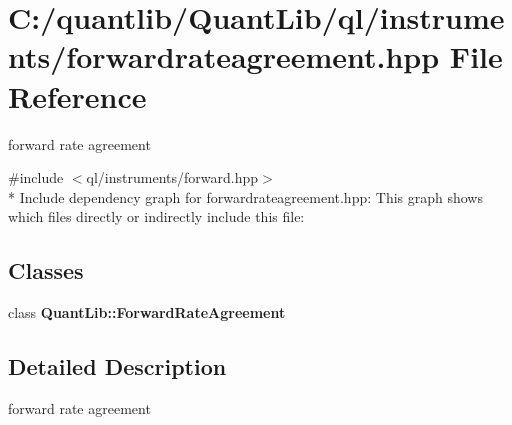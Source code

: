 \section{C\+:/quantlib/\+Quant\+Lib/ql/instruments/forwardrateagreement.hpp File Reference}
\label{forwardrateagreement_8hpp}


forward rate agreement  


{\ttfamily \#include $<$ql/instruments/forward.\+hpp$>$}\\*
Include dependency graph for forwardrateagreement.\+hpp\+:
This graph shows which files directly or indirectly include this file\+:
\subsection*{Classes}
\begin{DoxyCompactItemize}
\item 
class {\bf Quant\+Lib\+::\+Forward\+Rate\+Agreement}
\end{DoxyCompactItemize}


\subsection{Detailed Description}
forward rate agreement 

